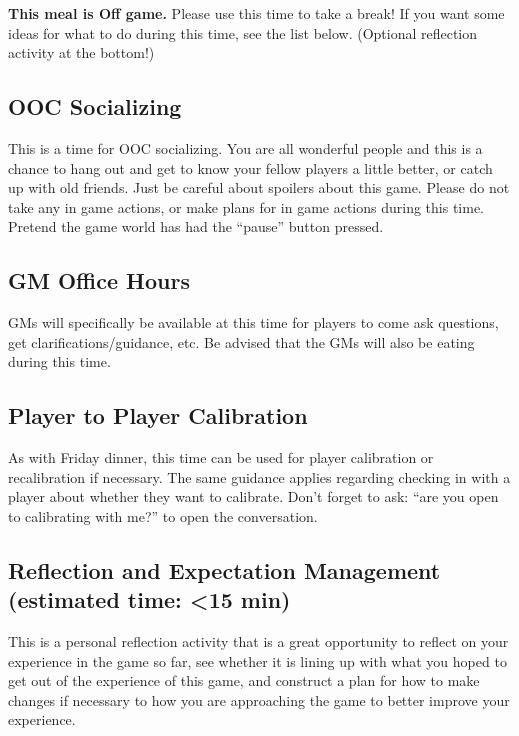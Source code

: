 \documentclass[green]{GL2020}
\begin{document}
\name{\gMidGame{}}

{\Large \textbf{This meal is Off game.}} Please use this time to take a break! If you want some ideas for what to do during this time, see the list below. (Optional reflection activity at the bottom!)

\subsection*{OOC Socializing}
This is a time for OOC socializing. You are all wonderful people and this is a chance to hang out and get to know your fellow players a little better, or catch up with old friends. Just be careful about spoilers about this game. Please do not take any in game actions, or make plans for in game actions during this time. Pretend the game world has had the ``pause'' button pressed.

\subsection*{GM Office Hours}
GMs will specifically be available at this time for players to come ask questions, get clarifications/guidance, etc. Be advised that the GMs will also be eating during this time.

\subsection*{Player to Player Calibration}
As with Friday dinner, this time can be used for player calibration or recalibration if necessary. The same guidance applies regarding checking in with a player about whether they want to calibrate. Don’t forget to ask: ``are you open to calibrating with me?'' to open the conversation.

\subsection*{Reflection and Expectation Management (estimated time: <15 min)}
This is a personal reflection activity that is a great opportunity to reflect on your experience in the game so far, see whether it is lining up with what you hoped to get out of the experience of this game, and construct a plan for how to make changes if necessary to how you are approaching the game to better improve your experience.
\end{document}
